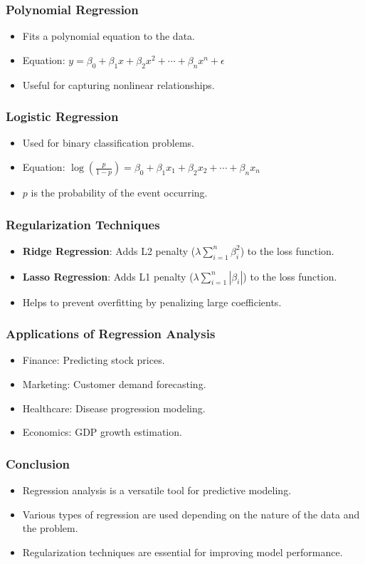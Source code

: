 \documentclass{beamer}
\begin{document}
\begin{frame}
\frametitle{Polynomial Regression}
\begin{itemize}
    \item Fits a polynomial equation to the data.
    \item Equation: \( y = \beta_0 + \beta_1 x + \beta_2 x^2 + \cdots + \beta_n x^n + \epsilon \)
    \item Useful for capturing nonlinear relationships.
\end{itemize}
\end{frame}

\begin{frame}
\frametitle{Logistic Regression}
\begin{itemize}
    \item Used for binary classification problems.
    \item Equation: \( \log\left(\frac{p}{1-p}\right) = \beta_0 + \beta_1 x_1 + \beta_2 x_2 + \cdots + \beta_n x_n \)
    \item \(p\) is the probability of the event occurring.
\end{itemize}
\end{frame}

\begin{frame}
\frametitle{Regularization Techniques}
\begin{itemize}
    \item \textbf{Ridge Regression}: Adds L2 penalty (\(\lambda \sum_{i=1}^{n} \beta_i^2\)) to the loss function.
    \item \textbf{Lasso Regression}: Adds L1 penalty (\(\lambda \sum_{i=1}^{n} |\beta_i|\)) to the loss function.
    \item Helps to prevent overfitting by penalizing large coefficients.
\end{itemize}
\end{frame}

\begin{frame}
\frametitle{Applications of Regression Analysis}
\begin{itemize}
    \item Finance: Predicting stock prices.
    \item Marketing: Customer demand forecasting.
    \item Healthcare: Disease progression modeling.
    \item Economics: GDP growth estimation.
\end{itemize}
\end{frame}

\begin{frame}
\frametitle{Conclusion}
\begin{itemize}
    \item Regression analysis is a versatile tool for predictive modeling.
    \item Various types of regression are used depending on the nature of the data and the problem.
    \item Regularization techniques are essential for improving model performance.
\end{itemize}
\end{frame}
\end{document}
